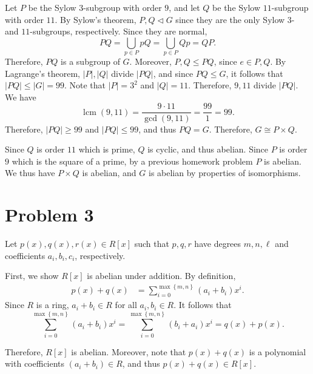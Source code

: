 \documentclass[11pt, letterpaper]{report}
\begin{document}
Let $P$ be the Sylow $3$-subgroup with order $9$, and let $Q$ be the Sylow $11$-subgroup with order $11$. By Sylow's theorem, $P,Q\triangleleft G$ since they are the only Sylow $3$- and $11$-subgroups, respectively. Since they are normal,
\[
	PQ=\bigcup_{p\in P}pQ=\bigcup_{p\in P}Qp=QP
.\]
Therefore, $PQ$ is a subgroup of $G$. Moreover, $P,Q\leq PQ$, since $e\in P,Q $. By Lagrange's theorem, $\left| P \right| ,\left| Q \right| $ divide $\left| PQ \right| $, and since $PQ\leq G$, it follows that $\left| PQ \right| \leq \left| G \right| =99$. Note that $\left| P \right| =3^2$ and $\left| Q \right| =11$. Therefore, $9,11$ divide $\left| PQ \right| $. We have
\[
	\operatorname{lcm}(9,11) =\frac{9\cdot 11}{\operatorname{gcd}(9,11)}=\frac{99}{1}=99
.\]
Therefore, $\left| PQ \right| \geq 99$ and $\left| PQ \right| \leq 99$, and thus $PQ=G$. Therefore, $G\cong P\times Q$.

Since $Q$ is order $11$ which is prime, $Q$ is cyclic, and thus abelian. Since $P$ is order $9$ which is the square of a prime, by a previous homework problem $P$ is abelian. We thus have $P\times Q$ is abelian, and $G$ is abelian by properties of isomorphisms.
\section*{Problem 3}
Let $p(x),q(x),r(x)\in R[x]$ such that $p,q,r$ have degrees $m,n,\ell $ and coefficients $a_i,b_i,c_i$, respectively.

First, we show $R[x]$ is abelian under addition. By definition,
\begin{align*}
	p\left(x \right) +q(x)&=\sum_{i=0}^{\max \left\{ m,n \right\} } \left( a_i+b_i \right) x^i
.\end{align*}
Since $R$ is a ring, $a_i+b_i\in R$ for all $a_i,b_i\in R$. It follows that
\[
	\sum_{i=0}^{\max \left\{ m,n \right\} } \left( a_i+b_i \right) x^i=\sum_{i=0}^{\max \left\{ m,n \right\} } \left( b_i+a_i \right) x^i=q(x)+p(x)
.\]

Therefore, $R[x]$ is abelian. Moreover, note that $p(x)+q(x)$ is a polynomial with coefficients $(a_i+b_i)\in R$, and thus $p(x)+q(x)\in R[x]$.
\end{document}
